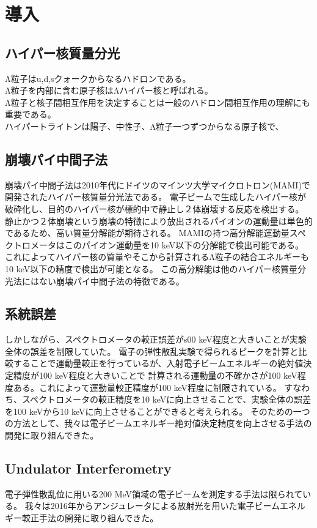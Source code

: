 \documentclass[a4paper,11pt,uplatex]{jsarticle}
\begin{document}
\section{導入}
\subsection{ハイパー核質量分光}
Λ粒子はu,d,sクォークからなるハドロンである。\\
Λ粒子を内部に含む原子核はΛハイパー核と呼ばれる。\\
Λ粒子と核子間相互作用を決定することは一般のハドロン間相互作用の理解にも重要である。\\
ハイパートライトンは陽子、中性子、Λ粒子一つずつからなる原子核で、
\subsection{崩壊パイ中間子法}
崩壊パイ中間子法は2010年代にドイツのマインツ大学マイクロトロン(MAMI)で開発されたハイパー核質量分光法である。
電子ビームで生成したハイパー核が破砕化し、目的のハイパー核が標的中で静止し２体崩壊する反応を検出する。
静止かつ２体崩壊という崩壊の特徴により放出されるパイオンの運動量は単色的であるため、高い質量分解能が期待される。
MAMIの持つ高分解能運動量スペクトロメータはこのパイオン運動量を10 keV以下の分解能で検出可能である。
これによってハイパー核の質量やそこから計算されるΛ粒子の結合エネルギーも10 keV以下の精度で検出が可能となる。
この高分解能は他のハイパー核質量分光法にはない崩壊パイ中間子法の特徴である。
\subsection{系統誤差}
しかしながら、スペクトロメータの較正誤差がs00 keV程度と大きいことが実験全体の誤差を制限していた。
電子の弾性散乱実験で得られるピークを計算と比較することで運動量較正を行っているが、入射電子ビームエネルギーの絶対値決定精度が100 keV程度と大きいことで
計算される運動量の不確かさが100 keV程度ある。これによって運動量較正精度が100 keV程度に制限されている。
すなわち、スペクトロメータの較正精度を10 keVに向上させることで、実験全体の誤差を100 keVから10 keVに向上させることができると考えられる。
そのための一つの方法として、我々は電子ビームエネルギー絶対値決定精度を向上させる手法の開発に取り組んできた。
\subsection{Undulator Interferometry}
電子弾性散乱位に用いる200 MeV領域の電子ビームを測定する手法は限られている。
我々は2016年からアンジュレータによる放射光を用いた電子ビームエネルギー較正手法の開発に取り組んできた。
\end{document}

